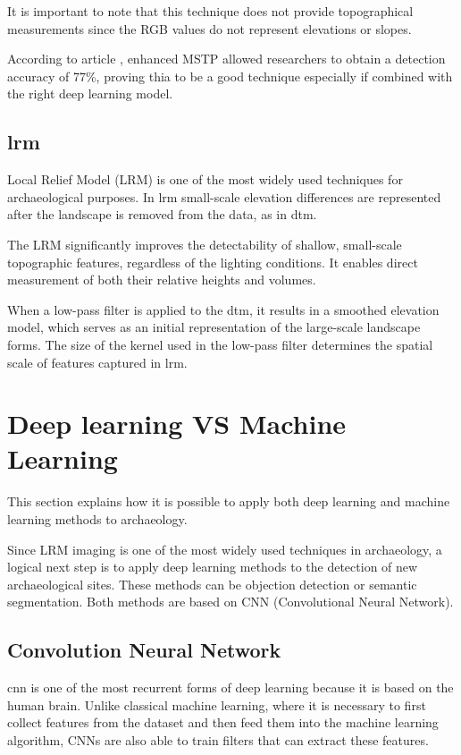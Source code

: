 It is important to note that this technique does not provide topographical measurements since the RGB values do not represent elevations or slopes.

According to article \cite{emstp}, enhanced MSTP allowed researchers to obtain a detection accuracy of 77\%, proving thia to be a good technique especially if combined with the right deep learning model.

\subsection{\ac{lrm}}

Local Relief Model (LRM) is one of the most widely used techniques for archaeological purposes. In \ac{lrm} small-scale elevation differences are represented after the landscape is removed from the data, as in \ac{dtm}. 

The LRM significantly improves the detectability of shallow, small-scale topographic features, regardless of the lighting conditions. It enables direct measurement of both their relative heights and volumes\cite{lrm}.

When a low-pass filter is applied to the \ac{dtm}, it results in a smoothed elevation model, which serves as an initial representation of the large-scale landscape forms. The size of the kernel used in the low-pass filter determines the spatial scale of features captured in \ac{lrm}.

\section{Deep learning VS Machine Learning}

This section explains how it is possible to apply both deep learning and machine learning methods to archaeology.

Since LRM imaging is one of the most widely used techniques in archaeology, a logical next step is to apply deep learning methods to the detection of new archaeological sites. These methods can be objection detection or semantic segmentation. Both methods are based on CNN (Convolutional Neural Network).

\subsection{Convolution Neural Network }
\ac{cnn} is one of the most recurrent forms of deep learning because it is based on the human brain. Unlike classical machine learning, where it is necessary to first collect features from the dataset and then feed them into the machine learning algorithm, CNNs are also able to train filters that can extract these features.


